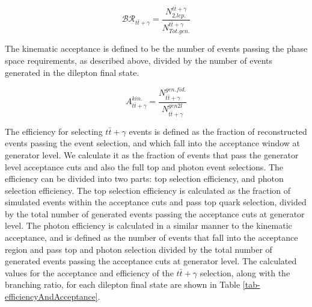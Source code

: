 \begin{equation}
\mathcal{BR}_{t\bar{t}+\gamma} = \frac{N_{2. lep.}^{t\bar{t}+\gamma}}{N_{Tot. gen.}^{t\bar{t}+\gamma}}
\end{equation} 

The kinematic acceptance is defined to be the number of events passing the phase space requirements, as described above, divided by the number of events generated in the dilepton final state.

\begin{equation}
A_{t\bar{t}+\gamma}^{kin.} = \frac{N_{t\bar{t}+\gamma}^{gen. fid.}}{N_{t\bar{t}+\gamma}^{gen 2l}}
\end{equation} 

The efficiency for selecting $t\bar{t}+\gamma$ events is defined as the fraction of reconstructed events passing the event selection, and which fall into the acceptance window at generator level. We calculate it as the fraction of events that pass the generator level acceptance cuts and also the full top and photon event selections. The efficiency can be divided into two parts: top selection efficiency, and photon selection efficiency. The top selection efficiency is calculated as the fraction of simulated events within the acceptance cuts and pass top quark selection, divided by the total number of generated events passing the acceptance cuts at generator level. The photon efficiency is calculated in a similar manner to the kinematic acceptance, and is defined as the number of events that fall into the acceptance region and pass top and photon selection divided by the total number of generated events passing the acceptance cuts at generator level. The calculated values for the acceptance and efficiency of the $t\bar{t}+\gamma$ selection, along with the branching ratio, for each dilepton final state are shown in Table \ref{tab-efficiencyAndAcceptance}.


